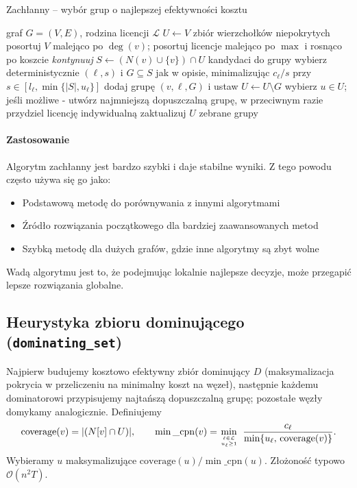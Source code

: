 \begin{algorithm}[H]
\caption{Zachłanny -- wybór grup o najlepszej efektywności kosztu}
\label{alg:greedy}
\begin{algorithmic}[1]
\Require graf $G=(V,E)$, rodzina licencji $\mathcal{L}$
\State $U \gets V$ \Comment zbiór wierzchołków niepokrytych
\State posortuj $V$ malejąco po $\deg(v)$; posortuj licencje malejąco po $\max$ i rosnąco po koszcie
   \State \textit{kontynuuj} \EndIf
  \State $S \gets (N(v)\cup\{v\})\cap U$ \Comment kandydaci do grupy
  \State wybierz deterministycznie $(\ell,s)$ i $G\subseteq S$ jak w opisie, minimalizując $c_\ell/s$ przy $s\in[l_\ell,\min\{|S|,u_\ell\}]$
    \State dodaj grupę $(v,\ell,G)$ i ustaw $U\gets U\setminus G$
  \EndIf
\EndFor
{}
  \State wybierz $u\in U$; jeśli możliwe - utwórz najmniejszą dopuszczalną grupę, w przeciwnym razie przydziel licencję indywidualną
  \State zaktualizuj $U$
\EndWhile
\State \Return zebrane grupy
\end{algorithmic}
\end{algorithm}

\paragraph{Zastosowanie}
Algorytm zachłanny jest bardzo szybki i daje stabilne wyniki. Z tego powodu często używa się go jako:
\begin{itemize}
  \item Podstawową metodę do porównywania z innymi algorytmami
  \item Źródło rozwiązania początkowego dla bardziej zaawansowanych metod
  \item Szybką metodę dla dużych grafów, gdzie inne algorytmy są zbyt wolne
\end{itemize}
Wadą algorytmu jest to, że podejmując lokalnie najlepsze decyzje, może przegapić lepsze rozwiązania globalne.

\subsection{Heurystyka zbioru dominującego (\texttt{dominating\_set})}\label{subsec:ds}

Najpierw budujemy kosztowo efektywny zbiór dominujący $D$ (maksymalizacja pokrycia w przeliczeniu na minimalny koszt na węzeł), następnie każdemu dominatorowi przypisujemy najtańszą dopuszczalną grupę; pozostałe węzły domykamy analogicznie. Definiujemy
\[
\mathrm{coverage}(v)=|(N[v]\cap U)|,\qquad \min\_\mathrm{cpn}(v)=\min\limits_{\ell\in\mathcal{L}\atop u_\ell\ge 1}\ \frac{c_\ell}{\min\{u_\ell,\,\mathrm{coverage}(v)\}}.
\]
Wybieramy $u$ maksymalizujące $\mathrm{coverage}(u)/\min\_\mathrm{cpn}(u)$. Złożoność typowo $\mathcal{O}(n^2T)$.


